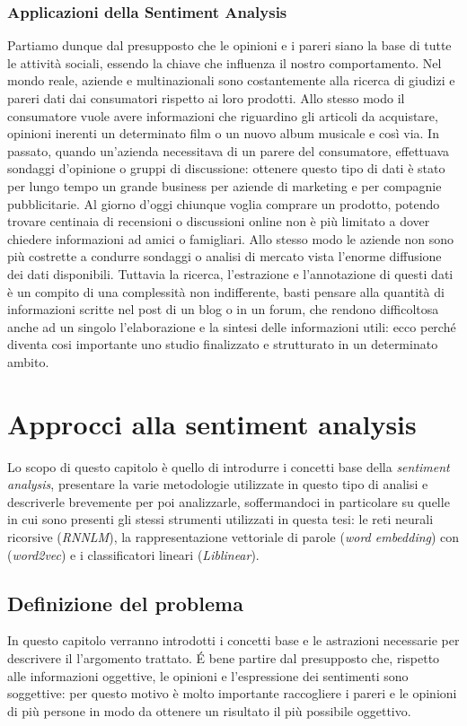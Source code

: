 \documentclass[a4paper,12pt,openright,twoside]{report}
\theoremstyle{definition}
\begin{document}
\subsection{Applicazioni della Sentiment Analysis}
Partiamo dunque dal presupposto che le opinioni e i pareri siano la base di tutte le attività sociali,
 essendo la chiave che influenza il nostro comportamento. Nel mondo reale, aziende e multinazionali 
 sono costantemente alla ricerca di giudizi e pareri dati dai consumatori  rispetto ai loro prodotti. 
 Allo stesso modo il consumatore vuole avere informazioni che riguardino gli articoli da acquistare, 
 opinioni inerenti un determinato film o un nuovo album musicale e così via. In passato, quando un’azienda 
 necessitava di un parere del consumatore, effettuava sondaggi d’opinione o gruppi di discussione: 
 ottenere questo tipo di dati è stato per lungo tempo un grande business per aziende di marketing e 
 per compagnie pubblicitarie.
Al giorno d’oggi chiunque voglia comprare un prodotto, potendo trovare centinaia di recensioni o 
discussioni online non è più limitato a dover chiedere informazioni ad amici o famigliari. 
Allo stesso modo le aziende non sono più costrette a condurre sondaggi o analisi di mercato vista 
l’enorme diffusione dei dati disponibili. Tuttavia la ricerca, l’estrazione e l’annotazione di questi 
dati è un compito di una complessità non indifferente, basti pensare alla quantità di informazioni 
scritte nel post di un blog o in un forum, che rendono difficoltosa anche ad un singolo l'elaborazione 
e la sintesi delle informazioni utili: ecco perché diventa cosi importante uno studio finalizzato e 
strutturato in un determinato ambito.

\chapter{Approcci alla sentiment analysis}

Lo scopo di questo capitolo è quello di introdurre i concetti base della \emph{sentiment analysis}, 
presentare la varie metodologie utilizzate in questo tipo di analisi e descriverle brevemente per poi 
analizzarle, soffermandoci in particolare su quelle in cui sono presenti gli stessi strumenti 
utilizzati in questa tesi: le reti neurali ricorsive (\emph{RNNLM}), 
la rappresentazione vettoriale di parole (\emph{word embedding})
con (\emph{word2vec}) e 
i classificatori lineari (\emph{Liblinear}).

\section{Definizione del problema}
In questo capitolo verranno introdotti i concetti base e le astrazioni necessarie
per descrivere il l'argomento trattato.
\'E bene partire dal presupposto che, rispetto alle informazioni oggettive, 
le opinioni e l'espressione dei sentimenti sono
soggettive: per questo motivo è molto importante raccogliere i pareri e le opinioni di più persone
in modo da ottenere un risultato il più possibile oggettivo.
\end{document}
